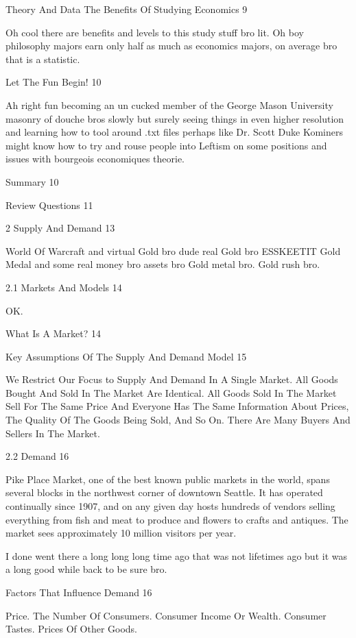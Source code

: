 Theory And Data The Benefits Of Studying Economics 9

Oh cool there are benefits and levels to this study stuff bro lit. Oh boy philosophy majors earn only half as much as economics majors, on average bro that is a statistic.

Let The Fun Begin! 10

Ah right fun becoming an un cucked member of the George Mason University masonry of douche bros slowly but surely seeing things in even higher resolution and learning how to tool around .txt files perhaps like Dr. Scott Duke Kominers might know how to try and rouse people into Leftism on some positions and issues with bourgeois economiques theorie.

Summary 10



Review Questions 11



2 Supply And Demand 13

World Of Warcraft and virtual Gold bro dude real Gold bro ESSKEETIT Gold Medal and some real money bro assets bro Gold metal bro. Gold rush bro.

2.1 Markets And Models 14

OK.

What Is A Market? 14



Key Assumptions Of The Supply And Demand Model 15

We Restrict Our Focus to Supply And Demand In A Single Market. All Goods Bought And Sold In The Market Are Identical. All Goods Sold In The Market Sell For The Same Price And Everyone Has The Same Information About Prices, The Quality Of The Goods Being Sold, And So On. There Are Many Buyers And Sellers In The Market.

2.2 Demand 16

Pike Place Market, one of the best known public markets in the world, spans several blocks in the northwest corner of downtown Seattle. It has operated continually since 1907, and on any given day hosts hundreds of vendors selling everything from fish and meat to produce and flowers to crafts and antiques. The market sees approximately 10 million visitors per year.

I done went there a long long long time ago that was not lifetimes ago but it was a long good while back to be sure bro.

Factors That Influence Demand 16

Price. The Number Of Consumers. Consumer Income Or Wealth. Consumer Tastes. Prices Of Other Goods.

